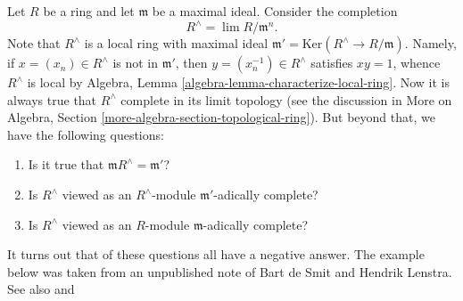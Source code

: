 \noindent
Let $R$ be a ring and let $\mathfrak m$ be a maximal ideal. Consider the
completion
$$
R^\wedge = \lim R/\mathfrak m^n.
$$
Note that $R^\wedge$ is a local ring with maximal ideal
$\mathfrak m' = \text{Ker}(R^\wedge \to R/\mathfrak m)$.
Namely, if $x = (x_n) \in R^\wedge$ is not in $\mathfrak m'$, then
$y = (x_n^{-1}) \in R^\wedge$ satisfies $xy = 1$, whence $R^\wedge$ is local by
Algebra, Lemma \ref{algebra-lemma-characterize-local-ring}. Now it is
always true that $R^\wedge$ complete in its limit topology (see the
discussion in
More on Algebra, Section \ref{more-algebra-section-topological-ring}).
But beyond that, we have the following questions:
\begin{enumerate}
\item Is it true that $\mathfrak m R^\wedge = \mathfrak m'$?
\item Is $R^\wedge$ viewed as an $R^\wedge$-module $\mathfrak m'$-adically
complete?
\item Is $R^\wedge$ viewed as an $R$-module $\mathfrak m$-adically complete?
\end{enumerate}
It turns out that of these questions all have a negative answer.
The example below was taken from an unpublished note of
Bart de Smit and Hendrik Lenstra. See also
\cite[Exercise III.2.12]{Bourbaki-CA} and
\cite[Example 1.8]{Yekutieli}

